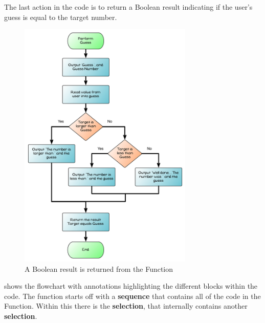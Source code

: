 \clearpage
The last action in the code is to return a Boolean result indicating if the user's guess is equal to the target number.

\begin{figure}[htbp]
   \centering
   \includegraphics[width=0.74\textwidth]{./topics/control-flow/diagrams/PerformGuess5} 
   \caption{A Boolean result is returned from the Function}
   \label{fig:perform-guess-seq-5}
\end{figure}


\clearpage

 shows the flowchart with annotations highlighting the different blocks within the code. The function starts off with a \textbf{sequence} that contains all of the code in the Function. Within this there is the \textbf{selection}, that internally contains another \textbf{selection}.

